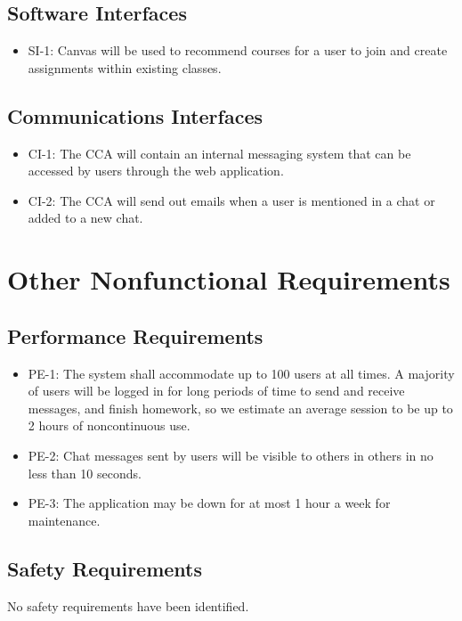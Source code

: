 \documentclass{scrreprt}
\begin{document}
\section{Software Interfaces}
\begin{itemize}
\item SI-1: Canvas will be used to recommend courses for a user to join and create assignments within existing classes.
\end{itemize}

\section{Communications Interfaces}
\begin{itemize}
	\item CI-1: The CCA will contain an internal messaging system that can be accessed by users through the web application.
	\item CI-2: The CCA will send out emails when a user is mentioned in a chat or added to a new chat.
\end{itemize}
\chapter{Other Nonfunctional Requirements}

\section{Performance Requirements}
\begin{itemize}
	\item PE-1: The system shall accommodate up to 100 users at all times. A majority of users will be logged in for long periods of time to send and receive messages, and finish homework, so we estimate an average session to be up to 2 hours of noncontinuous use.
	\item PE-2: Chat messages sent by users will be visible to others in others in no less than 10 seconds.
	\item PE-3: The application may be down for at most 1 hour a week for maintenance. 
\end{itemize}

\section{Safety Requirements}
No safety requirements have been identified.
\end{document}
